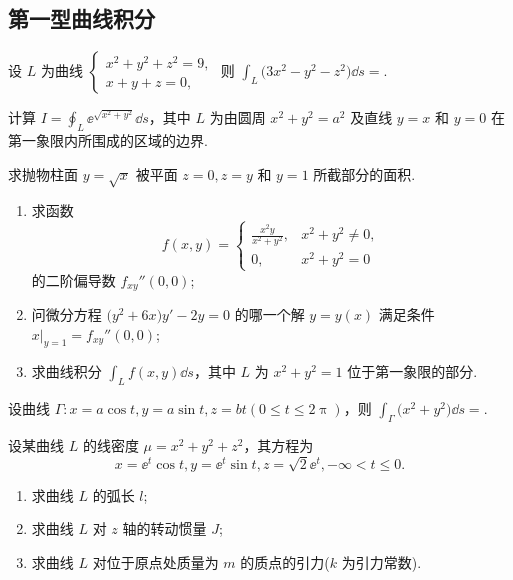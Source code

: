 \subsection{第一型曲线积分}

	\begin{ti}
		设 $L$ 为曲线 $\begin{cases}
			x^{2} + y^{2} + z^{2} = 9,\\
			x + y + z = 0,
		\end{cases}$ 则 $\int_{L} \bigl( 3x^{2} - y^{2} - z^{2} \bigr) \dd{s} = $\kuo.

		\fourch{$27\uppi$}{$18\uppi$}{$12\uppi$}{$6\uppi$}
	\end{ti}

	\begin{ti}
		计算 $I = \oint_{L} \ee^{\sqrt{x^{2} + y^{2}}} \dd{s}$，其中 $L$ 为由圆周 $x^{2} + y^{2} = a^{2}$ 及直线 $y = x$ 和 $y = 0$ 在第一象限内所围成的区域的边界.
	\end{ti}

	\begin{ti}
		求抛物柱面 $y = \sqrt{x}$ 被平面 $z = 0, z = y$ 和 $y = 1$ 所截部分的面积.
	\end{ti}

	\begin{ti}
		\begin{enumerate}
			\item 求函数
			\[
				f(x,y) = \begin{cases}
					\frac{x^{2}y}{x^{2} + y^{2}}, & x^{2} + y^{2} \ne 0,\\
					0, & x^{2} + y^{2} = 0
				\end{cases}
			\]
			的二阶偏导数 $f_{xy}''(0,0)$;
			\item 问微分方程 $\bigl( y^{2} + 6x \bigr)y' - 2y = 0$ 的哪一个解 $y = y(x)$ 满足条件 $x|_{y = 1} = f_{xy}''(0,0)$;
			\item 求曲线积分 $\int_{L} f(x,y) \dd{s}$，其中 $L$ 为 $x^{2} + y^{2} = 1$ 位于第一象限的部分.
		\end{enumerate}
	\end{ti}

	\begin{ti}
		设曲线 $\varGamma: x = a \cos t, y = a \sin t, z = bt(0 \leq t \leq 2\uppi)$，则 $\int_{\varGamma} \bigl( x^{2} + y^{2} \bigr) \dd{s} = $\htwo.
	\end{ti}

	\begin{ti}
		设某曲线 $L$ 的线密度 $\mu = x^{2} + y^{2} + z^{2}$，其方程为
		\[
			x = \ee^{t} \cos t, y = \ee^{t} \sin t, z = \sqrt{2} \ee^{t}, - \infty < t \leq 0.
		\]
		\begin{enumerate}
			\item 求曲线 $L$ 的弧长 $l$;
			\item 求曲线 $L$ 对 $z$ 轴的转动惯量 $J$;
			\item 求曲线 $L$ 对位于原点处质量为 $m$ 的质点的引力($k$ 为引力常数).
		\end{enumerate}
	\end{ti}
